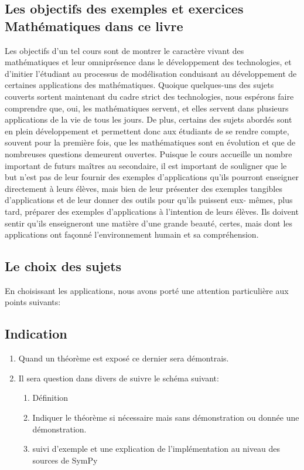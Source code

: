 \subsection*{Les objectifs des exemples et exercices Mathématiques dans ce livre}
Les objectifs d’un tel cours sont de montrer le caractère vivant des mathématiques
et leur omniprésence dans le développement des technologies, et d’initier l’étudiant au
processus de modélisation conduisant au développement de certaines applications des
mathématiques.
Quoique quelques-uns des sujets couverts sortent maintenant du cadre strict des
technologies, nous espérons faire comprendre que, oui, les mathématiques servent, et
elles servent dans plusieurs applications de la vie de tous les jours. De plus, certains
des sujets abordés sont en plein développement et permettent donc aux étudiants de se
rendre compte, souvent pour la première fois, que les mathématiques sont en évolution
et que de nombreuses questions demeurent ouvertes.
Puisque le cours accueille un nombre important de futurs maîtres au secondaire, il est
important de souligner que le but n'est pas de leur fournir des exemples d’applications
qu'ils pourront enseigner directement à leurs élèves, mais bien de leur présenter des
exemples tangibles d'applications et de leur donner des outils pour qu’ils puissent eux-
mêmes, plus tard, préparer des exemples d'applications à l'intention de leurs élèves. Ils
doivent sentir qu'ils enseigneront une matière d’une grande beauté, certes, mais dont
les applications ont façonné l'environnement humain et sa compréhension.
\subsection*{Le choix des sujets}
En choisissant les applications, nous avons porté une attention particulière aux points suivants:
\subsection*{Indication}
 \begin{enumerate}
  \item Quand un théorème est exposé ce dernier sera démontrais.
  \item Il sera question dans divers de suivre le schéma suivant:
  \begin{enumerate}
    \item Définition
    \item Indiquer le théorème si nécessaire mais sans démonstration ou donnée une démonstration.
    \item suivi d'exemple et une explication de l'implémentation au niveau des sources de SymPy 
  \end{enumerate}
 \end{enumerate}

